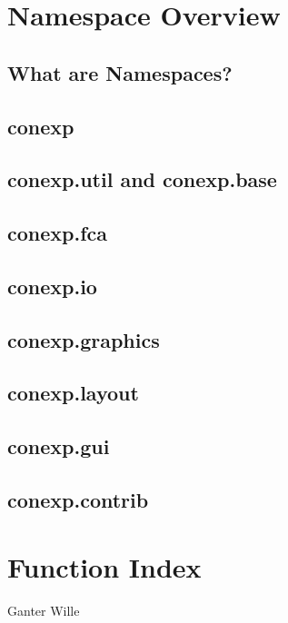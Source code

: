 \documentclass{scrbook}
\theoremstyle{plain}
\theoremstyle{plain}
\theoremstyle{plain}
\theoremstyle{nonumberplain}
\begin{document}
\chapter{Namespace Overview}

\section{What are Namespaces?}

\section{conexp}

\section{conexp.util and conexp.base}

\section{conexp.fca}

\section{conexp.io}

\section{conexp.graphics}

\section{conexp.layout}

\section{conexp.gui}

\section{conexp.contrib}


\chapter{Function Index}




\appendix

\begin{thebibliography}{xxxxxxx}
 Ganter Wille
\end{thebibliography}
\end{document}
